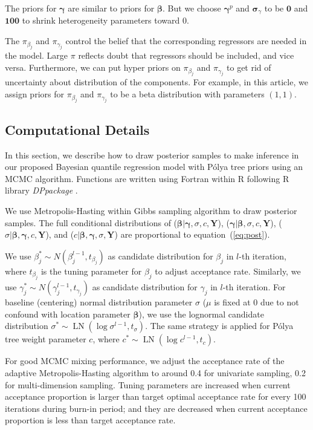 \documentclass[12pt]{article}
\newcommand{\polya}{P\'{o}lya}
\DeclareMathOperator{\LN}{LN}
\begin{document}
The priors for $\bm \gamma$ are similar to priors for $\bm \beta$. But
we choose $\bm \gamma^p$ and $\bm \sigma_{\gamma}$ to be $\bm 0$ and
$\bm{100}$ to shrink heterogeneity parameters toward 0.

The $\pi_{\beta_j}$ and $\pi_{\gamma_j}$ control the belief that the
corresponding regressors are needed in the model. Large $\pi$ reflects
doubt that regressors should be included, and vice versa. Furthermore,
we can put hyper priors on $\pi_{\beta_j}$ and $\pi_{\gamma_j}$ to get
rid of uncertainty about distribution of the components.  For example,
in this article, we assign priors for $\pi_{\beta_j}$ and
$\pi_{\gamma_j}$ to be a beta distribution with parameters $(1,1)$.

\subsection{Computational Details}\label{sec:computation}

In this section, we describe how to draw posterior samples to make
inference in our proposed Bayesian quantile regression model with
\polya{} tree priors using an MCMC algorithm. Functions are written
using Fortran within R \citep{R} following R library
\textit{DPpackage} \citep{DPpackage}.

We use Metropolis-Hasting within Gibbs sampling algorithm to draw
posterior samples. The full conditional distributions of ($\bm
\beta|\bm \gamma, \sigma, c, \bm Y$), ($\bm \gamma|\bm \beta, \sigma,
c, \bm Y$), ($\sigma|\bm \beta, \bm \gamma, c, \bm Y$), and ($c|\bm
\beta, \bm \gamma, \sigma, \bm Y$) are proportional to equation~(\ref{eq:post}).

We use $\beta_j^* \sim N(\beta_j^{l-1}, t_{\beta_j} )$ as
candidate distribution for $\beta_j$ in $l$-th iteration, where
$t_{\beta_j}$ is the tuning parameter for $\beta_j$
to adjust acceptance rate.  Similarly, we use $\gamma_j^* \sim
N(\gamma_j^{l-1}, t_{\gamma_j})$ as candidate distribution
for $\gamma_j$ in $l$-th iteration.  For baseline (centering) normal
distribution parameter $\sigma$ ($\mu$ is fixed at 0 due to not
confound with location parameter $\bm \beta$), we use the lognormal
candidate distribution $\sigma^* \sim \LN(\log \sigma^{l-1},
t_{\sigma})$. The same strategy is applied for \polya{} tree weight
parameter $c$, where $c^* \sim \LN(\log c^{l-1}, t_c)$.

For good MCMC mixing performance, we adjust the acceptance rate of the
adaptive Metropolis-Hasting algorithm to around 0.4 for univariate
sampling, 0.2 for multi-dimension sampling. Tuning parameters are
increased when current acceptance proportion is larger than target
optimal acceptance rate for every 100 iterations during burn-in
period; and they are decreased when current acceptance proportion is
less than target acceptance rate.
\end{document}

